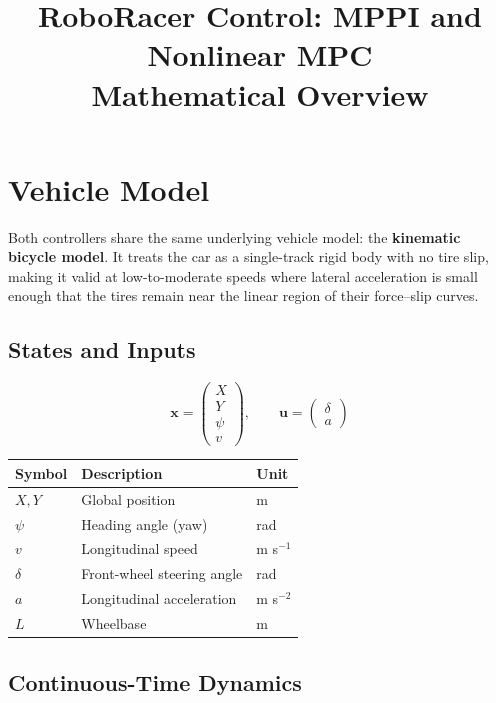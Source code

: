 \documentclass[11pt]{article}
\title{\textbf{RoboRacer Control: MPPI and Nonlinear MPC}\\[0.4em]
\large Mathematical Overview}
\author{}
\date{}
\begin{document}
\maketitle
\tableofcontents
\newpage

\section{Vehicle Model}

Both controllers share the same underlying vehicle model: the \textbf{kinematic bicycle
model}. It treats the car as a single-track rigid body with no tire slip, making
it valid at low-to-moderate speeds where lateral acceleration is small enough
that the tires remain near the linear region of their force--slip curves.

\subsection{States and Inputs}

\[
\bm{x} = \begin{pmatrix} X \\ Y \\ \psi \\ v \end{pmatrix}, \qquad
\bm{u} = \begin{pmatrix} \delta \\ a \end{pmatrix}
\]

\begin{center}
\begin{tabular}{lll}
\toprule
Symbol & Description & Unit \\
\midrule
$X, Y$ & Global position & m \\
$\psi$ & Heading angle (yaw) & rad \\
$v$    & Longitudinal speed & m s$^{-1}$ \\
$\delta$ & Front-wheel steering angle & rad \\
$a$    & Longitudinal acceleration & m s$^{-2}$ \\
$L$    & Wheelbase & m \\
\bottomrule
\end{tabular}
\end{center}

\subsection{Continuous-Time Dynamics}
\end{document}
